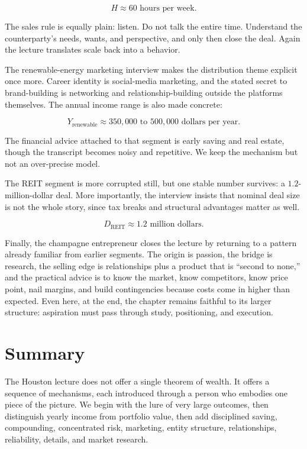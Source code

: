 \begin{equation}
H \approx 60 \text{ hours per week}.
\end{equation}

The sales rule is equally plain: listen. Do not talk the entire time. Understand the counterparty's needs, wants, and perspective, and only then close the deal. Again the lecture translates scale back into a behavior.

The renewable-energy marketing interview makes the distribution theme explicit once more. Career identity is social-media marketing, and the stated secret to brand-building is networking and relationship-building outside the platforms themselves. The annual income range is also made concrete:

\begin{equation}
Y_{\mathrm{renewable}} \approx 350{,}000 \text{ to } 500{,}000 \text{ dollars per year}.
\end{equation}

The financial advice attached to that segment is early saving and real estate, though the transcript becomes noisy and repetitive. We keep the mechanism but not an over-precise model.

The REIT segment is more corrupted still, but one stable number survives: a \(1.2\)-million-dollar deal. More importantly, the interview insists that nominal deal size is not the whole story, since tax breaks and structural advantages matter as well.

\begin{equation}
D_{\mathrm{REIT}} \approx 1.2 \text{ million dollars}.
\end{equation}

Finally, the champagne entrepreneur closes the lecture by returning to a pattern already familiar from earlier segments. The origin is passion, the bridge is research, the selling edge is relationships plus a product that is ``second to none,'' and the practical advice is to know the market, know competitors, know price point, nail margins, and build contingencies because costs come in higher than expected. Even here, at the end, the chapter remains faithful to its larger structure: aspiration must pass through study, positioning, and execution.

\section{Summary}

The Houston lecture does not offer a single theorem of wealth. It offers a sequence of mechanisms, each introduced through a person who embodies one piece of the picture. We begin with the lure of very large outcomes, then distinguish yearly income from portfolio value, then add disciplined saving, compounding, concentrated risk, marketing, entity structure, relationships, reliability, details, and market research.

